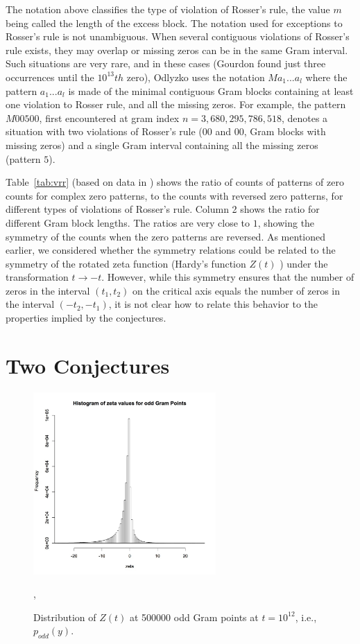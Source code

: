 \documentclass[twoside]{article}
\theoremstyle{definition}
\begin{document}
{The notation above classifies the type of violation of Rosser's rule, the value $m$ being called the length of the excess block. The notation used for exceptions to Rosser's rule is not unambiguous. When several contiguous violations of Rosser's rule exists, they may overlap or missing zeros can be in the same Gram interval. Such situations are very rare, and in these cases (Gourdon found just three occurrences until the $10^{13}th$ zero), Odlyzko uses the notation $Ma_1 ...a_l$ where the pattern $a_1 . . . a_l$ is made of the minimal contiguous Gram blocks containing at least one violation to Rosser rule, and all the missing zeros. For example, the pattern $M00500$, first encountered at gram index $n = 3,680,295,786,518$, denotes a situation with two violations of Rosser's rule ($00$ and $00$, Gram blocks with missing zeros) and a single Gram interval containing all the missing zeros (pattern $5$). 

Table~\ref{tab:vrr}  (based on data in \cite{gourdon}) shows the  ratio of counts of patterns of zero counts for complex zero patterns, to the counts with reversed zero patterns, for different types of violations of Rosser's rule. Column 2 shows the ratio for different Gram block lengths. The ratios are very close to  $1$, showing the symmetry of the counts when the zero patterns are reversed.
 As mentioned earlier, we considered whether the symmetry relations could be related to the symmetry  of the rotated zeta function (Hardy's function $Z(t)$ ) under the transformation $t \rightarrow -t$. However, while this symmetry ensures that the number of zeros in the interval $(t_1, t_2)$ on the critical axis equals the number of zeros in the interval $(-t_2, -t_1)$, it is not clear how to relate this behavior  to the properties implied by the conjectures.

\section{\label{sec7}Two Conjectures}

\begin{figure}
\centering
\includegraphics[width=0.62\textwidth]{ozeta.jpg}
\caption[]{ 
  Distribution of  $Z(t)$ at 500000 odd Gram points  at $t = 10^{12}$, i.e., $p_{odd}(y)$.
 }
\vspace{1mm}, 
\label{oddhist}


\end{figure}}
\end{document}
